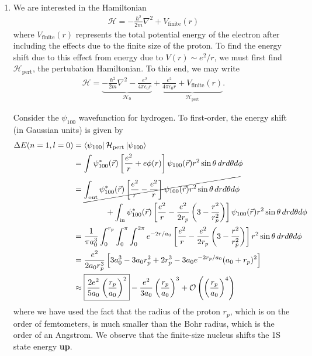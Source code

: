 \documentclass{book}
\theoremstyle{definition}
\newcommand{\ham}{\mathcal{H}}
\newcommand{\f}[2]{\frac{#1}{#2}}
\newcommand{\lp}{\left(}
\newcommand{\rp}{\right)}
\newcommand{\lb}{\left[}
\newcommand{\rb}{\right]}
\begin{document}
\begin{enumerate}[label=(\alph*)]
	
	\item 
	We are interested in the Hamiltonian
	\begin{align*}
		\ham = -\f{\hbar^2}{2m} \nabla^2 + V_\text{finite}(r)
	\end{align*}
	where $V_\text{finite}(r)$ represents the total potential energy of the electron after including the effects due to the finite size of the proton. To find the energy shift due to this effect from energy due to $V(r) \sim e^2/r$, we must first find $\ham_\text{pert}$, the pertubation Hamiltonian. To this end, we may write
	\begin{align*}
		\ham = \underbrace{-\f{\hbar^2}{2m} \nabla^2 - \f{e^2}{4\pi \epsilon_0 r}}_{\ham_0} + \underbrace{\f{e^2}{4\pi \epsilon_0 r} + V_\text{finite}(r)}_{\ham_\text{pert}}.
	\end{align*}
	
	Consider the $\psi_{100}$ wavefunction for hydrogen. To first-order, the energy shift (in Gaussian units) is given by 
	\begin{align*}
		\Delta E(n=1,l=0) &= \bra{\psi_{100}} \ham_\text{pert} \ket{\psi_{100}} \\ 
		&= \int \psi_{100}^*(\vec{r}) \lb \f{e^2}{r} + e\phi(r)  \rb  \psi_{100}(\vec{r})  r^2\sin\theta \,dr d\theta d\phi  \\
		&= \cancel{\int_\text{out} \psi_{100}^*(\vec{r}) \lb \f{e^2}{r} - \f{e^2}{r}  \rb \psi_{100}(\vec{r}) r^2\sin\theta \,dr d\theta d\phi} \\
		&\quad\quad\quad\quad + \int_\text{in} \psi_{100}^*(\vec{r}) \lb \f{e^2}{r} - \f{e^2}{2r_p}\lp 3 - \f{r^2}{r_p^2} \rp  \rb \psi_{100}(\vec{r})  r^2\sin\theta \,dr d\theta d\phi \\
		&= \f{1}{\pi a_0^3}\int_0^{r_p} \int_0^{\pi}\int_0^{2\pi} e^{-2r/a_0} \lb \f{e^2}{r} - \f{e^2}{2r_p}\lp 3 - \f{r^2}{r_p^2} \rp  \rb  r^2 \sin\theta\,dr d\theta d\phi \\
		&= \f{e^2}{2a_0 r_p^3}\lb 3a_0^3 - 3a_0 r_p^2 + 2r_p^3 - 3a_0 e^{-2r_p/a_0}(a_0 + r_p)^2 \rb \\
		&\approx \boxed{\f{2e^2}{5a_0} \lp \f{r_p}{a_0} \rp^2} - \f{e^2}{3a_0}\lp \f{r_p}{a_0} \rp^3 + \mathcal{O}\lp \lp \f{r_p}{a_0}\rp ^4\rp 
	\end{align*}
	where we have used the fact that the radius of the proton $r_p$, which is on the order of femtometers, is much smaller than the Bohr radius, which is the order of an Angstrom.  We observe that the finite-size nucleus shifts the 1S  state energy \textbf{up}. 
	

\end{enumerate}
\end{document}

